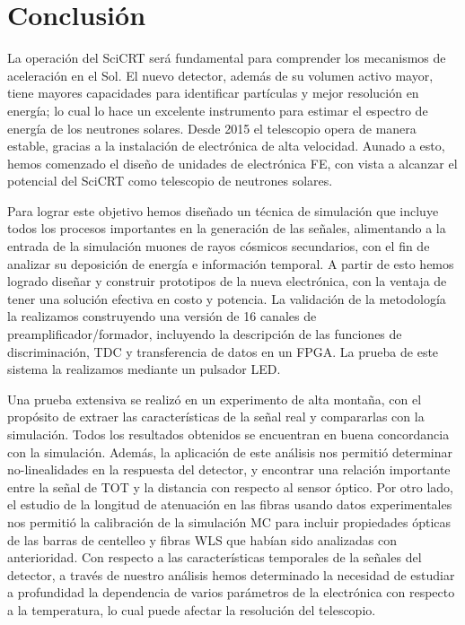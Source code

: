 
\chapter{Conclusión}

La operación del SciCRT será fundamental para comprender los mecanismos de aceleración en el Sol. El nuevo detector, además de su volumen activo mayor, tiene mayores capacidades para identificar partículas y mejor resolución en energía; lo cual lo hace un excelente instrumento para estimar el espectro de energía de los neutrones solares. Desde \num{2015} el telescopio opera de manera estable, gracias a la instalación de electrónica de alta velocidad. Aunado a esto, hemos comenzado el diseño de unidades de electrónica FE, con vista a alcanzar el potencial del SciCRT como telescopio de neutrones solares.

Para lograr este objetivo hemos diseñado un técnica de simulación que incluye todos los procesos importantes en la generación de las señales, alimentando a la entrada de la simulación muones de rayos cósmicos secundarios, con el fin de analizar su deposición de energía e información temporal. A partir de esto hemos logrado diseñar y construir prototipos de la nueva electrónica, con la ventaja de tener una solución efectiva en costo y potencia. La validación de la metodología la realizamos construyendo una versión de \num{16} canales de preamplificador/formador, incluyendo la descripción de las funciones de discriminación, TDC y transferencia de datos en un FPGA. La prueba de este sistema la realizamos mediante un pulsador LED.

Una prueba extensiva se realizó en un experimento de alta montaña, con el propósito de extraer las características de la señal real y compararlas con la simulación. Todos los resultados obtenidos se encuentran en buena concordancia con la simulación. Además, la aplicación de este análisis nos permitió determinar no-linealidades en la respuesta del detector, y encontrar una relación importante entre la señal de TOT y la distancia con respecto al sensor óptico. Por otro lado, el estudio de la longitud de atenuación en las fibras usando datos experimentales nos permitió la calibración de la simulación MC para incluir propiedades ópticas de las barras de centelleo y fibras WLS que habían sido analizadas con anterioridad. Con respecto a las características temporales de la señales del detector, a través de nuestro análisis hemos determinado la necesidad de estudiar a profundidad la dependencia de varios parámetros de la electrónica con respecto a la temperatura, lo cual puede afectar la resolución del telescopio.


